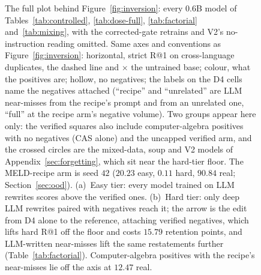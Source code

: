 \begin{figure}[htbp]
\caption{The full plot behind Figure~\ref{fig:inversion}: every $0.6$B model of Tables~\ref{tab:controlled}, \ref{tab:dose-full}, \ref{tab:factorial} and~\ref{tab:mixing}, with the corrected-gate retrains and V2's no-instruction reading omitted. Same axes and conventions as Figure~\ref{fig:inversion}: horizontal, strict R@1 on cross-language duplicates, the dashed line and $\times$ the untrained base; colour, what the positives are; hollow, no negatives; the labels on the D4 cells name the negatives attached (``recipe'' and ``unrelated'' are LLM near-misses from the recipe's prompt and from an unrelated one, ``full'' at the recipe arm's negative volume). Two groups appear here only: the verified squares also include computer-algebra positives with no negatives (CAS alone) and the uncapped verified arm, and the crossed circles are the mixed-data, soup and V2 models of Appendix~\ref{sec:forgetting}, which sit near the hard-tier floor. The MELD-recipe arm is seed $42$ ($20.23$ easy, $0.11$ hard, $90.84$ real; Section~\ref{sec:ood}). (a)~Easy tier: every model trained on LLM rewrites scores above the verified ones. (b)~Hard tier: only deep LLM rewrites paired with negatives reach it; the arrow is the edit from D4 alone to the reference, attaching verified negatives, which lifts hard R@1 off the floor and costs $15.79$ retention points, and LLM-written near-misses lift the same restatements further (Table~\ref{tab:factorial}). Computer-algebra positives with the recipe's near-misses lie off the axis at $12.47$ real.}
\label{fig:inversion-full}
\end{figure}
